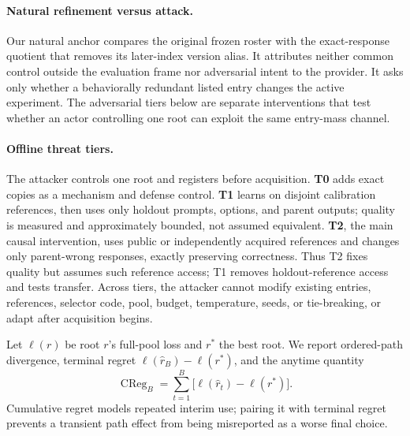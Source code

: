 \paragraph{Natural refinement versus attack.}
Our natural anchor compares the original frozen roster with the exact-response quotient that removes its later-index version alias. It attributes neither common control outside the evaluation frame nor adversarial intent to the provider. It asks only whether a behaviorally redundant listed entry changes the active experiment. The adversarial tiers below are separate interventions that test whether an actor controlling one root can exploit the same entry-mass channel.

\paragraph{Offline threat tiers.}
The attacker controls one root and registers before acquisition. \textbf{T0} adds exact copies as a mechanism and defense control. \textbf{T1} learns on disjoint calibration references, then uses only holdout prompts, options, and parent outputs; quality is measured and approximately bounded, not assumed equivalent. \textbf{T2}, the main causal intervention, uses public or independently acquired references and changes only parent-wrong responses, exactly preserving correctness. Thus T2 fixes quality but assumes such reference access; T1 removes holdout-reference access and tests transfer. Across tiers, the attacker cannot modify existing entries, references, selector code, pool, budget, temperature, seeds, or tie-breaking, or adapt after acquisition begins.

Let $\ell(r)$ be root $r$'s full-pool loss and $r^*$ the best root. We report ordered-path divergence, terminal regret $\ell(\widehat r_B)-\ell(r^*)$, and the anytime quantity
\[
    \operatorname{CReg}_B=\sum_{t=1}^{B}\bigl[\ell(\widehat r_t)-\ell(r^*)\bigr].
\]
Cumulative regret models repeated interim use; pairing it with terminal regret prevents a transient path effect from being misreported as a worse final choice.
